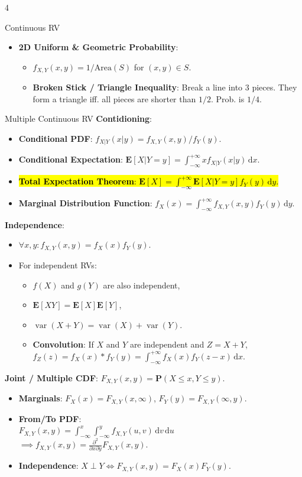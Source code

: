 \documentclass[landscape,a4paper]{article}
\renewcommand{\emph}[1]{\hl{#1}}
\newcommand{\PP}{\mathbf{P}}
\newcommand{\EE}{\mathbf{E}}
\newcommand{\var}{\operatorname{var}}
\begin{document}
\begin{multicols*}{4}
\begin{card}{Continuous RV}
\begin{itemize}
				\item \textbf{2D Uniform \& Geometric Probability}:
				\begin{itemize}
					\item $f_{X,Y}(x,y) = 1/\text{Area}(S)$ for $(x,y) \in S$.
					\item \textbf{Broken Stick / Triangle Inequality}: Break a line into 3 pieces. They form a triangle iff. all pieces are shorter than $1/2$. Prob. is $1/4$.
				\end{itemize}
			\end{itemize}
		\end{card}
		\begin{card}{Multiple Continuous RV}
			\textbf{Contidioning}:
			\begin{itemize}
				\item \textbf{Conditional PDF}: $f_{X|Y}(x|y)=f_{X,Y}(x,y)/f_{Y}(y)$.
				\item \textbf{Conditional Expectation}: $\EE[X|Y=y]=\int_{-\infty}^{+\infty}xf_{X|Y}(x|y)\,\mathrm dx$.
				\item \emph{\textbf{Total Expectation Theorem}: $\EE[X]=\int_{-\infty}^{+\infty}\EE[X|Y=y]f_Y(y)\,\mathrm dy$.}
				\item \textbf{Marginal Distribution Function}: $f_X(x)=\int_{-\infty}^{+\infty} f_{X,Y}(x,y)f_Y(y)\,\mathrm dy$.
			\end{itemize}
			\textbf{Independence}:
			\begin{itemize}
				\item $\forall x,y\colon f_{X,Y}(x,y)=f_X(x)f_Y(y)$.
				\item For independent RVs:
				\begin{itemize}
					\item $f(X)$ and $g(Y)$ are also independent,
					\item $\EE[XY]=\EE[X]\EE[Y]$,
					\item $\var(X+Y)=\var(X)+\var(Y)$.
					\item \textbf{Convolution}: If $X$ and $Y$ are independent and $Z=X+Y$, $f_Z(z)=f_X(x)\ast f_Y(y)=\int_{-\infty}^{+\infty}f_X(x)f_Y(z-x)\,\mathrm dx$.
				\end{itemize}
			\end{itemize}
			\textbf{Joint / Multiple CDF}: $F_{X,Y}(x,y) = \PP(X \le x, Y \le y)$.
			\begin{itemize}
				\item \textbf{Marginals}: $F_X(x) = F_{X,Y}(x, \infty)$, $F_Y(y) = F_{X,Y}(\infty, y)$.
				\item \textbf{From/To PDF}:\\$F_{X,Y}(x,y) = \int_{-\infty}^{x} \int_{-\infty}^{y} f_{X,Y}(u,v)\,\mathrm dv\,\mathrm du $\\$\implies f_{X,Y}(x,y) = \frac{\partial^2}{\partial x \partial y} F_{X,Y}(x,y)$.
				\item \textbf{Independence}: $X \perp Y \iff F_{X,Y}(x,y) = F_X(x)F_Y(y)$.
			\end{itemize}
			

\end{card}
\end{multicols*}
\end{document}
